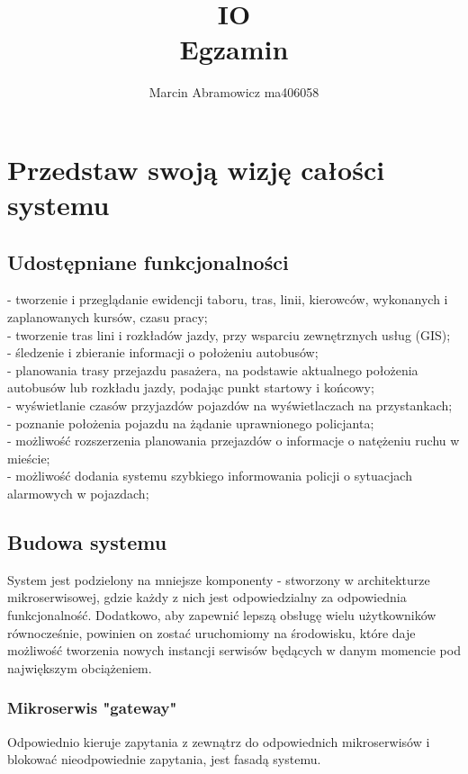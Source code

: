 \documentclass{article}
\title{IO \\ Egzamin}
\author{Marcin Abramowicz ma406058}
\begin{document}
  \maketitle

  \newpage
  \section{Przedstaw swoją wizję całości systemu}
    \subsection{Udostępniane funkcjonalności}
      - tworzenie i przeglądanie ewidencji taboru, tras, linii, kierowców, wykonanych i zaplanowanych kursów, czasu pracy; \\
      - tworzenie tras lini i rozkładów jazdy, przy wsparciu zewnętrznych usług (GIS); \\
      - śledzenie i zbieranie informacji o położeniu autobusów; \\
      - planowania trasy przejazdu pasażera, na podstawie aktualnego położenia autobusów lub rozkładu jazdy, podając punkt startowy i końcowy; \\
      - wyświetlanie czasów przyjazdów pojazdów na wyświetlaczach na przystankach; \\
      - poznanie położenia pojazdu na żądanie uprawnionego policjanta; \\
      - możliwość rozszerzenia planowania przejazdów o informacje o natężeniu ruchu w mieście; \\
      - możliwość dodania systemu szybkiego informowania policji o sytuacjach alarmowych w pojazdach;

    \subsection{Budowa systemu}
      System jest podzielony na mniejsze komponenty - stworzony w architekturze mikroserwisowej, gdzie każdy z nich jest odpowiedzialny za odpowiednia funkcjonalność. Dodatkowo, aby zapewnić lepszą obsługę wielu użytkowników równocześnie, powinien on zostać uruchomiomy na środowisku, które daje możliwość tworzenia nowych instancji serwisów będących w danym momencie pod największym obciążeniem.

      \subsubsection{Mikroserwis "gateway"}
        Odpowiednio kieruje zapytania z zewnątrz do odpowiednich mikroserwisów i blokować nieodpowiednie zapytania, jest fasadą systemu.
\end{document}
